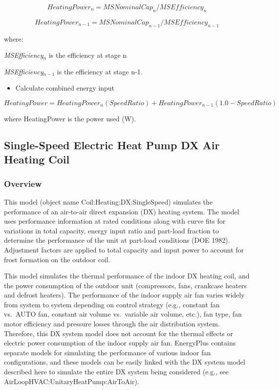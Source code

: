 \begin{equation}
HeatingPowe{r_n} = MSNominalCa{p_n}/MSEfficienc{y_n}
\end{equation}

\begin{equation}
HeatingPowe{r_{n - 1}} = MSNominalCa{p_{n - 1}}/MSEfficienc{y_{n - 1}}
\end{equation}

where:

\emph{MSEfficiency\(_{n}\)} is the efficiency at stage n

\emph{MSEfficiency\(_{n-1}\)} is the efficiency at stage n-1.

\begin{itemize}
  \item Calculate combined energy input
\end{itemize}

\begin{equation}
HeatingPower = HeatingPowe{r_n}\left( {SpeedRatio} \right) + HeatingPowe{r_{n - 1}}(1.0 - SpeedRatio)
\end{equation}

where HeatingPower is the power used (W).

\subsection{Single-Speed Electric Heat Pump DX Air Heating Coil}\label{single-speed-electric-heat-pump-dx-air-heating-coil}

\subsubsection{Overview}\label{overview-6-000}

This model (object name Coil:Heating:DX:SingleSpeed) simulates the performance of an air-to-air direct expansion (DX) heating system. The model uses performance information at rated conditions along with curve fits for variations in total capacity, energy input ratio and part-load fraction to determine the performance of the unit at part-load conditions (DOE 1982).~ Adjustment factors are applied to total capacity and input power to account for frost formation on the outdoor coil.

This model simulates the thermal performance of the indoor DX heating coil, and the power consumption of the outdoor unit (compressors, fans, crankcase heaters and defrost heaters). The performance of the indoor supply air fan varies widely from system to system depending on control strategy (e.g., constant fan vs.~AUTO fan, constant air volume vs.~variable air volume, etc.), fan type, fan motor efficiency and pressure losses through the air distribution system. Therefore, this DX system model does not account for the thermal effects or electric power consumption of the indoor supply air fan. EnergyPlus contains separate models for simulating the performance of various indoor fan configurations, and these models can be easily linked with the DX system model described here to simulate the entire DX system being considered (e.g., see AirLoopHVAC:UnitaryHeatPump:AirToAir).

